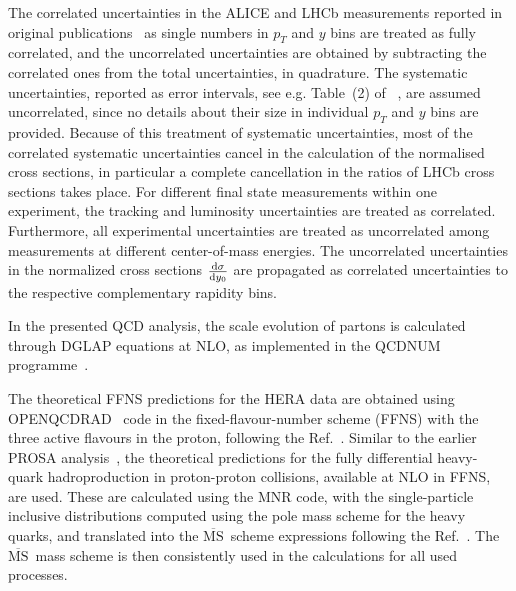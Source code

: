 \documentclass[12pt]{article}
\newcommand{\msbar}{$\overline{\text{MS}}\, $\xspace}
\begin{document}
The correlated uncertainties in the ALICE and LHCb measurements reported in original publications~\cite{Aaij:2016jht, Aaij:2013mga, Aaij:2015bpa, Acharya:2019mgn, Acharya:2017jgo, Aaij:2013noa} as single numbers in $p_T$ and $y$ bins 
are treated as fully correlated, and the uncorrelated uncertainties are obtained by subtracting the correlated ones from the 
total uncertainties, in quadrature. The systematic uncertainties, reported as error intervals, see e.g. Table~(2) of ~\cite{Aaij:2016jht}, are assumed uncorrelated, since no details about their size in individual $p_T$ and $y$ bins are provided. 
Because of this treatment of systematic uncertainties, most of the correlated systematic uncertainties cancel in the calculation of the normalised cross sections, in particular a complete cancellation in the ratios of LHCb cross sections takes place.
For different final state measurements within one experiment, the tracking and luminosity uncertainties are treated as correlated. 
Furthermore, all experimental uncertainties are treated as uncorrelated among measurements at different center-of-mass energies. 
The uncorrelated uncertainties in the normalized cross sections $\frac{{\rm d}\sigma}{{\rm d}y_0}$ are propagated as correlated uncertainties to the respective complementary rapidity bins.

In the presented QCD analysis, the scale evolution of partons is calculated through DGLAP equations at NLO, as implemented in 
the QCDNUM programme~\cite{openqcdrad}.  

The theoretical FFNS predictions for the HERA data are obtained using OPENQCDRAD~\cite{openqcdrad} code in the 
fixed-flavour-number scheme (FFNS) with the three active flavours in the proton, following the Ref.~\cite{H1:2018flt}. 
Similar to the earlier PROSA analysis~\cite{Zenaiev:2015rfa}, the theoretical predictions for the fully differential 
heavy-quark hadroproduction in proton-proton collisions, available at NLO in FFNS, are used. These are calculated using 
the MNR code, with the single-particle inclusive distributions computed using the pole mass scheme for the heavy quarks, 
and translated into the \msbar scheme expressions following the Ref.~\cite{Dowling:2013baa}. The \msbar mass scheme is 
then consistently used in the calculations for all used processes.
\end{document}
